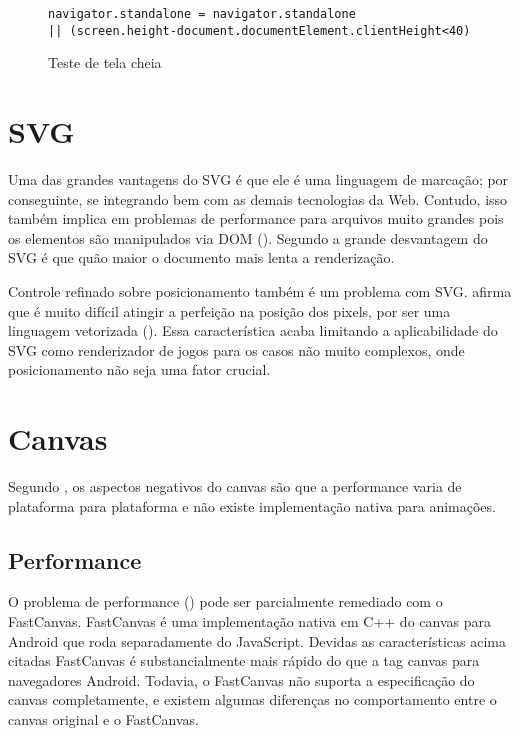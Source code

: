 \begin{figure}[H]
\centering
\begin{verbatim}
navigator.standalone = navigator.standalone 
|| (screen.height-document.documentElement.clientHeight<40)
\end{verbatim}
\caption{Teste de tela cheia}
\label{fig:fixJSTypes}
\end{figure}

\section{SVG}

Uma das grandes vantagens do SVG é que ele é uma linguagem de
marcação; por conseguinte, se integrando bem com as demais tecnologias
da Web. Contudo, isso também implica em problemas de performance para
arquivos muito grandes pois os elementos são manipulados via DOM
(). Segundo \citet{html5mostwanted} a
grande desvantagem do SVG é que quão maior o documento mais lenta a
renderização.

Controle refinado sobre posicionamento também é um problema com SVG.
\citet{html5mostwanted} afirma que é muito difícil atingir a
perfeição na posição dos pixels, por ser uma linguagem vetorizada
(). Essa característica acaba limitando
a aplicabilidade do SVG como renderizador de jogos para os casos não
muito complexos, onde posicionamento não seja uma fator crucial.

\section{Canvas}

Segundo \textsc{\autocite{html5mostwanted}}, os aspectos negativos do canvas são
que a performance varia de plataforma para plataforma e não existe
implementação nativa para animações.

\subsection{Performance}

O problema de performance () pode
ser parcialmente remediado com o FastCanvas. FastCanvas é uma
implementação nativa em C++ do canvas para Android que roda
separadamente do JavaScript. Devidas as características acima citadas
FastCanvas é substancialmente mais rápido do que a tag canvas para
navegadores Android. Todavia, o FastCanvas não suporta a
especificação do canvas completamente, e existem algumas diferenças no
comportamento entre o canvas original e o FastCanvas.

